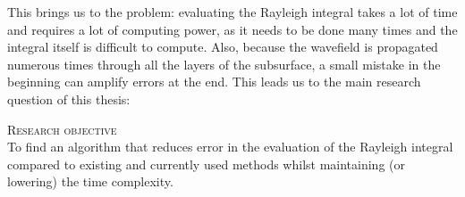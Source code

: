 This brings us to the problem: evaluating the Rayleigh integral takes a lot of time and requires a lot of computing power, as it needs to be done many times and the integral itself is difficult to compute.
Also, because the wavefield is propagated numerous times through all the layers of the subsurface, a small mistake in the beginning can amplify errors at the end.
This leads us to the main research question of this thesis:
\begin{tcolorbox}[enhanced, size=fbox, shadow={2.1mm}{-2mm}{0mm}{gray!20!white}, boxrule={.5pt}, colback=white, boxsep=10pt, left=5pt, right=5pt, sharp corners]
    \textsc{Research objective} \\
    To find an algorithm that reduces error in the evaluation of the Rayleigh integral compared to existing and currently used methods whilst maintaining (or lowering) the time complexity.
\end{tcolorbox}

